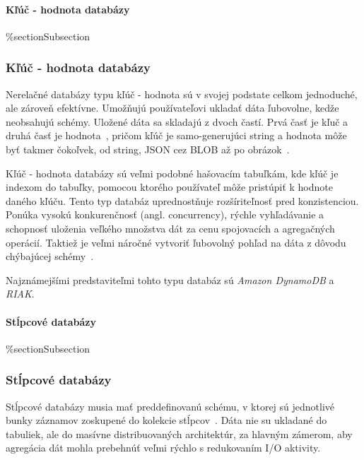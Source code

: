 %
%
{
	\paragraph{Kľúč - hodnota databázy}
}
{
	\%section{Subsection}
	\subsubsection{Kľúč - hodnota databázy}
}
\label{subsubsection:key_value_db}
Nerelačné databázy typu kľúč - hodnota sú v svojej podstate celkom jednoduché, ale zároveň efektívne. Umožňujú používateľovi ukladať dáta ľubovolne, kedže neobsahujú schémy. Uložené dáta sa skladajú z dvoch častí. Prvá časť je kľuč a druhá časť je hodnota~\cite{NoSQLDBvsRealtionDB}, pričom kľúč je samo-generujúci string a hodnota môže byť takmer čokoľvek, od string, JSON cez BLOB až po obrázok~\cite{MongoDBvsMySQL2015}.

Kľúč - hodnota databázy sú veľmi podobné hašovacím tabuľkám, kde kľúč je indexom do tabuľky, pomocou ktorého používateľ môže pristúpiť k hodnote daného kľúču. Tento typ databáz uprednostňuje rozšíriteľnosť pred konzistenciou. Ponúka vysokú konkurenčnosť (angl. concurrency), rýchle vyhľadávanie a schopnosť uloženia veľkého množstva dát za cenu spojovacích a agregačných operácií. Taktiež je veľmi náročné vytvoriť ľubovolný pohľad na dáta z dôvodu chýbajúcej schémy~\cite{NoSQLDBvsRealtionDB}.

Najznámejšími predstaviteľmi tohto typu databáz sú \textit{Amazon DynamoDB} a \textit{RIAK}.

%
%
{
	\paragraph{Stĺpcové databázy}
}
{
	\%section{Subsection}
	\subsubsection{Stĺpcové databázy}
}
\label{subsubsection:column_db}
Stĺpcové databázy musia mať preddefinovanú schému, v ktorej sú jednotlivé bunky záznamov zoskupené do kolekcie stĺpcov~\cite{MongoDBvsMySQL2015}. Dáta nie su ukladané do tabuliek, ale do masívne distribuovaných architektúr, za hlavným zámerom, aby agregácia dát mohla prebehnúť veľmi rýchlo s redukovaním I/O aktivity.

